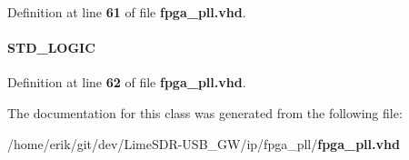 Definition at line {\bf 61} of file {\bf fpga\+\_\+pll.\+vhd}.

\paragraph[{sub\+\_\+wire5}]{ {\bfseries \textcolor{comment}{S\+T\+D\+\_\+\+L\+O\+G\+IC}\textcolor{vhdlchar}{ }} \hspace{0.3cm}{\ttfamily [Signal]}}\label{classfpga__pll_1_1SYN_a428d095cdf1fa14d47c103e910135ebb}


Definition at line {\bf 62} of file {\bf fpga\+\_\+pll.\+vhd}.



The documentation for this class was generated from the following file\+:\begin{DoxyCompactItemize}
\item 
/home/erik/git/dev/\+Lime\+S\+D\+R-\/\+U\+S\+B\+\_\+\+G\+W/ip/fpga\+\_\+pll/{\bf fpga\+\_\+pll.\+vhd}\end{DoxyCompactItemize}
